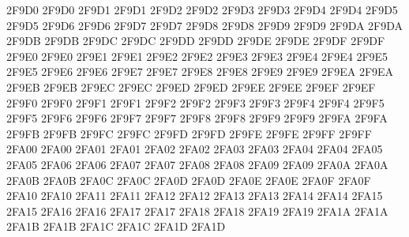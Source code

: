 \ID 2F9D0 2F9D0
\ID 2F9D1 2F9D1
\ID 2F9D2 2F9D2
\ID 2F9D3 2F9D3
\ID 2F9D4 2F9D4
\ID 2F9D5 2F9D5
\ID 2F9D6 2F9D6
\ID 2F9D7 2F9D7
\ID 2F9D8 2F9D8
\ID 2F9D9 2F9D9
\ID 2F9DA 2F9DA
\ID 2F9DB 2F9DB
\ID 2F9DC 2F9DC
\ID 2F9DD 2F9DD
\ID 2F9DE 2F9DE
\ID 2F9DF 2F9DF
\ID 2F9E0 2F9E0
\ID 2F9E1 2F9E1
\ID 2F9E2 2F9E2
\ID 2F9E3 2F9E3
\ID 2F9E4 2F9E4
\ID 2F9E5 2F9E5
\ID 2F9E6 2F9E6
\ID 2F9E7 2F9E7
\ID 2F9E8 2F9E8
\ID 2F9E9 2F9E9
\ID 2F9EA 2F9EA
\ID 2F9EB 2F9EB
\ID 2F9EC 2F9EC
\ID 2F9ED 2F9ED
\ID 2F9EE 2F9EE
\ID 2F9EF 2F9EF
\ID 2F9F0 2F9F0
\ID 2F9F1 2F9F1
\ID 2F9F2 2F9F2
\ID 2F9F3 2F9F3
\ID 2F9F4 2F9F4
\ID 2F9F5 2F9F5
\ID 2F9F6 2F9F6
\ID 2F9F7 2F9F7
\ID 2F9F8 2F9F8
\ID 2F9F9 2F9F9
\ID 2F9FA 2F9FA
\ID 2F9FB 2F9FB
\ID 2F9FC 2F9FC
\ID 2F9FD 2F9FD
\ID 2F9FE 2F9FE
\ID 2F9FF 2F9FF
\ID 2FA00 2FA00
\ID 2FA01 2FA01
\ID 2FA02 2FA02
\ID 2FA03 2FA03
\ID 2FA04 2FA04
\ID 2FA05 2FA05
\ID 2FA06 2FA06
\ID 2FA07 2FA07
\ID 2FA08 2FA08
\ID 2FA09 2FA09
\ID 2FA0A 2FA0A
\ID 2FA0B 2FA0B
\ID 2FA0C 2FA0C
\ID 2FA0D 2FA0D
\ID 2FA0E 2FA0E
\ID 2FA0F 2FA0F
\ID 2FA10 2FA10
\ID 2FA11 2FA11
\ID 2FA12 2FA12
\ID 2FA13 2FA13
\ID 2FA14 2FA14
\ID 2FA15 2FA15
\ID 2FA16 2FA16
\ID 2FA17 2FA17
\ID 2FA18 2FA18
\ID 2FA19 2FA19
\ID 2FA1A 2FA1A
\ID 2FA1B 2FA1B
\ID 2FA1C 2FA1C
\ID 2FA1D 2FA1D

\endgroup

